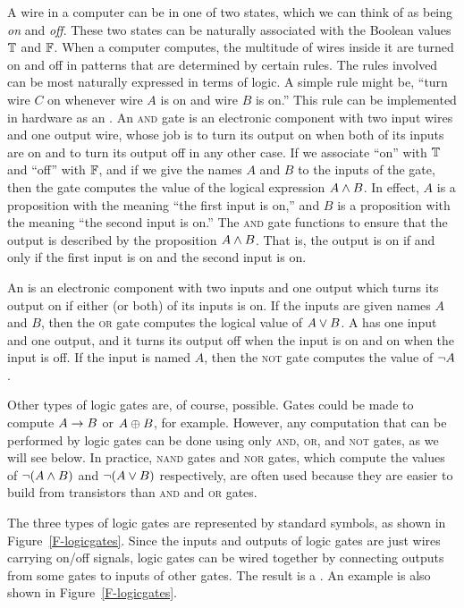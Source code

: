 A wire in a computer can be in one of two states, which we can
think of as being \emph{on} and \emph{off}.  These two states 
can be naturally associated with the Boolean values $\mathbb{T}$ and $\mathbb{F}$.
When a computer computes, the multitude of wires inside it are
turned on and off in patterns that are determined by certain rules.
The rules involved can be most naturally expressed in terms of logic.
A simple rule might be, ``turn wire $C$ on whenever wire $A$ is on
and wire $B$ is on.''  This rule can be implemented in hardware as
an .  An \textsc{and} gate is an electronic 
component with two input wires and one output wire, whose job is
to turn its output on when both of its inputs are on and to turn
its output off in any other case.  If we associate ``on'' with
$\mathbb{T}$ and ``off'' with $\mathbb{F}$, and if we give the names $A$ and $B$ to
the inputs of the gate, then the gate computes the value of the
logical expression $A\wedge B$.  In effect, $A$ is a proposition
with the meaning ``the first input is on,'' and $B$ is a proposition
with the meaning ``the second input is on.''  The \textsc{and} gate
functions to ensure that the output is described by the 
proposition $A \wedge B$.  That is, the output is on if and only if
the first input is on and the second input is on.

An  is an electronic component with two inputs
and one output which turns its output on if either (or both) of its
inputs is on.  If the inputs are given names $A$ and $B$, then
the \textsc{or} gate computes the logical value of $A\vee B$.
A  has one input and one output, and it turns
its output off when the input is on and on when the input is off.
If the input is named $A$, then the \textsc{not} gate computes the
value of $\lnot A$.

Other types of logic gates are, of course, possible.  Gates could
be made to compute $A\rightarrow B$ or $A\oplus B$, for example.  However,
any computation that can be performed by logic gates can be 
done using only \textsc{and}, \textsc{or}, and \textsc{not} gates,
as we will see below.  In practice, \textsc{nand} gates and
\textsc{nor} gates, which compute the values of $\lnot(A\wedge B)$
and $\lnot(A\vee B)$ respectively, are often used because they
are easier to build from transistors than \textsc{and} and \textsc{or}
gates.

The three types of logic gates are represented by standard symbols,
as shown in Figure~\ref{F-logicgates}.  Since the inputs and outputs
of logic gates are just wires carrying on/off signals, logic gates
can be wired together by connecting outputs from some gates to
inputs of other gates.  The result is a .
An example is also shown in Figure~\ref{F-logicgates}.


